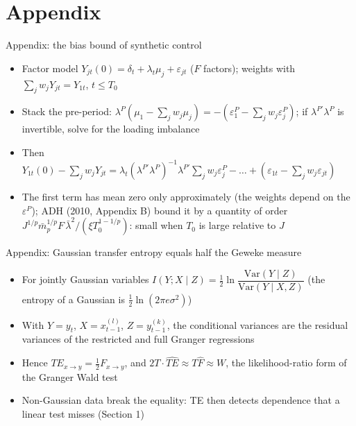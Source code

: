 \section{Appendix}

\begin{frame}{Appendix: the bias bound of synthetic control}
\hypertarget{atsapp1}{}
\itemsize{\small}
\begin{itemize}
    \item Factor model $Y_{jt}(0) = \delta_t + \lambda_t\mu_j + \varepsilon_{jt}$ ($F$ factors); weights with $\sum_jw_jY_{jt} = Y_{1t}$, $t \le T_0$
    \item Stack the pre-period: $\lambda^P(\mu_1 - \sum_jw_j\mu_j) = -(\varepsilon^P_1 - \sum_jw_j\varepsilon^P_j)$; if $\lambda^{P\prime}\lambda^P$ is invertible, solve for the loading imbalance
    \item Then $Y_{1t}(0) - \sum_jw_jY_{jt} = \lambda_t(\lambda^{P\prime}\lambda^P)^{-1}\lambda^{P\prime}\sum_jw_j\varepsilon^P_j - \dots + (\varepsilon_{1t} - \sum_jw_j\varepsilon_{jt})$
    \item The first term has mean zero only approximately (the weights depend on the $\varepsilon^P$); ADH (2010, Appendix B) bound it by a quantity of order $J^{1/p}\bar m_p^{1/p}F\,\bar\lambda^2/(\xi T_0^{1 - 1/p})$: small when $T_0$ is large relative to $J$
\end{itemize}
\end{frame}

\begin{frame}{Appendix: Gaussian transfer entropy equals half the Geweke measure}
\hypertarget{atsapp2}{}
\itemsize{\small}
\begin{itemize}
    \item For jointly Gaussian variables $I(Y; X\mid Z) = \frac12\ln\dfrac{\mathrm{Var}(Y\mid Z)}{\mathrm{Var}(Y\mid X, Z)}$ (the entropy of a Gaussian is $\frac12\ln(2\pi e\sigma^2)$)
    \item With $Y = y_t$, $X = x^{(l)}_{t-1}$, $Z = y^{(k)}_{t-1}$, the conditional variances are the residual variances of the restricted and full Granger regressions
    \item Hence $TE_{x\to y} = \frac12F_{x\to y}$, and $2T\cdot\widehat{TE} \approx T\hat F \approx W$, the likelihood-ratio form of the Granger Wald test 
    \item Non-Gaussian data break the equality: TE then detects dependence that a linear test misses (Section 1)
\end{itemize}
\end{frame}


